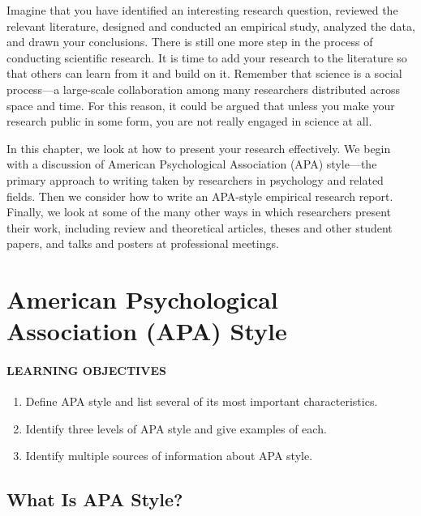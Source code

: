 \documentclass[
]{krantz}
\providecommand{\tightlist}{%
  \setlength{\itemsep}{0pt}\setlength{\parskip}{0pt}}
\begin{document}
Imagine that you have identified an interesting research question, reviewed the relevant literature, designed and conducted an empirical study, analyzed the data, and drawn your conclusions. There is still one more step in the process of conducting scientific research. It is time to add your research to the literature so that others can learn from it and build on it. Remember that science is a social process---a large-scale collaboration among many researchers distributed across space and time. For this reason, it could be argued that unless you make your research public in some form, you are not really engaged in science at all.

In this chapter, we look at how to present your research effectively. We begin with a discussion of American Psychological Association (APA) style---the primary approach to writing taken by researchers in psychology and related fields. Then we consider how to write an APA-style empirical research report. Finally, we look at some of the many other ways in which researchers present their work, including review and theoretical articles, theses and other student papers, and talks and posters at professional meetings.

\hypertarget{american-psychological-association-apa-style}{%
\section{American Psychological Association (APA) Style}\label{american-psychological-association-apa-style}}

\hypertarget{learning-objectives-32}{%
\paragraph*{LEARNING OBJECTIVES}\label{learning-objectives-32}}

\begin{enumerate}
\def\labelenumi{\arabic{enumi}.}
\tightlist
\item
  Define APA style and list several of its most important characteristics.
\item
  Identify three levels of APA style and give examples of each.
\item
  Identify multiple sources of information about APA style.
\end{enumerate}

\hypertarget{what-is-apa-style}{%
\subsection*{What Is APA Style?}\label{what-is-apa-style}}
\end{document}
